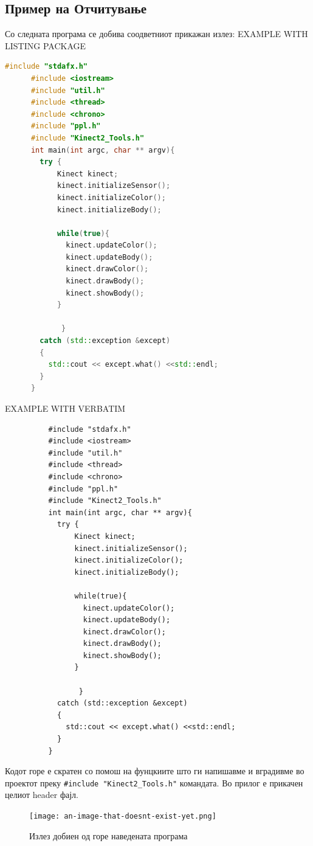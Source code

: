 \documentclass[12pt]{article}
\begin{document}
  \subsection{Пример на Отчитување}
    Со следната програма се добива соодветниот прикажан излез:
    EXAMPLE WITH LISTING PACKAGE
    \begin{lstlisting}[language=C++]
      #include "stdafx.h"
      #include <iostream>
      #include "util.h"
      #include <thread>
      #include <chrono>
      #include "ppl.h"
      #include "Kinect2_Tools.h"
      int main(int argc, char ** argv){
        try {
            Kinect kinect;
            kinect.initializeSensor();
            kinect.initializeColor();
            kinect.initializeBody();

            while(true){
              kinect.updateColor();
              kinect.updateBody();
              kinect.drawColor();
              kinect.drawBody();
              kinect.showBody();
            }

             }
        catch (std::exception &except)
        {
          std::cout << except.what() <<std::endl;
        }
      }
      \end{lstlisting}

      EXAMPLE WITH VERBATIM
      \begin{verbatim}
          #include "stdafx.h"
          #include <iostream>
          #include "util.h"
          #include <thread>
          #include <chrono>
          #include "ppl.h"
          #include "Kinect2_Tools.h"
          int main(int argc, char ** argv){
            try {
                Kinect kinect;
                kinect.initializeSensor();
                kinect.initializeColor();
                kinect.initializeBody();

                while(true){
                  kinect.updateColor();
                  kinect.updateBody();
                  kinect.drawColor();
                  kinect.drawBody();
                  kinect.showBody();
                }

                 }
            catch (std::exception &except)
            {
              std::cout << except.what() <<std::endl;
            }
          }
        \end{verbatim}

    Кодот горе е скратен со помош на фунцкиите што ги напишавме и вградивме во проектот преку \verb|#include "Kinect2_Tools.h"| командата. Во прилог е прикачен целиот header фајл.

    \begin{figure}[H]
      \texttt{[image: an-image-that-doesnt-exist-yet.png]}
      \centering
      \caption{Излез добиен од горе наведената програма}
      \label{fig:an-image-that-doesnt-exist-yet.png}
      \end{figure}
\end{document}
